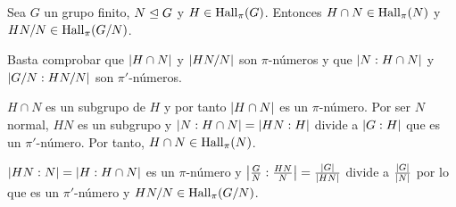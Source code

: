 \begin{proposicion}\label{prop:normalhall}
	Sea $G$ un grupo finito, $N\trianglelefteq G$ y $H\in \operatorname{Hall}_\pi(G)$. Entonces $H\cap N \in \operatorname{Hall}_\pi(N)$ y $HN/N \in \operatorname{Hall}_\pi(G/N)$.
	\begin{demostracion}
		Basta comprobar que $\left|H\cap N\right|$ y $\left|HN/N\right|$ son $\pi$-números y que $\left|N:H\cap N\right|$ y $\left|G/N:HN/N\right|$ son $\pi'$-números.
		
		$H\cap N$ es un subgrupo de $H$ y por tanto $\left|H\cap N\right|$ es un $\pi$-número. Por ser $N$ normal, $HN$ es un subgrupo y $\left|N:H\cap N\right| = \left|HN:H\right|$ divide a $\left|G:H\right|$ que es un $\pi'$-número. Por tanto, $H\cap N \in \operatorname{Hall}_\pi(N)$.
		
		$\left|HN:N\right| = \left|H:H\cap N\right|$ es un $\pi$-número y $\left|\frac{G}{N}:\frac{HN}{N}\right| = \frac{\left|G\right|}{\left|HN\right|}$ divide a $\frac{\left|G\right|}{\left|N\right|}$ por lo que es un $\pi'$-número y $HN/N \in \operatorname{Hall}_\pi(G/N)$.
	\end{demostracion}
\end{proposicion}

